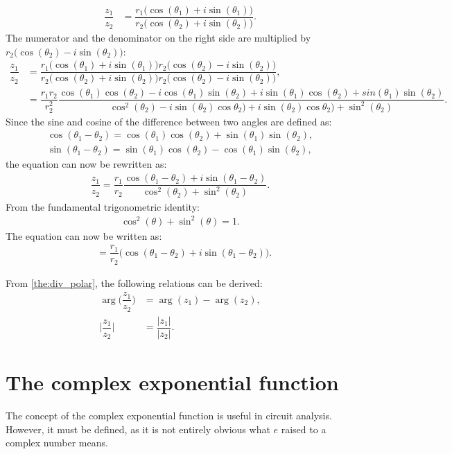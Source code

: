 \begin{prof}{}{}
\begin{align*}
\dfrac{z_1}{z_2}&=\dfrac{r_1\Big(\cos(\theta_1)+i\sin(\theta_1)\Big)}{r_2\Big(\cos(\theta_2)+i\sin(\theta_2)\Big)}.
\end{align*}
The numerator and the denominator on the right side are multiplied by $r_2\Big(\cos(\theta_2)-i\sin(\theta_2)\Big)$:
\begin{align*}
\dfrac{z_1}{z_2}&=\dfrac{r_1\Big(\cos(\theta_1)+i\sin(\theta_1)\Big)r_2\Big(\cos(\theta_2)-i\sin(\theta_2)\Big)}{r_2\Big(\cos(\theta_2)+i\sin(\theta_2)\Big)r_2\Big(\cos(\theta_2)-i\sin(\theta_2)\Big)},
\\
&=\dfrac{r_1 r_2}{r_2^2}\dfrac{\cos(\theta_1)\cos(\theta_2)-i\cos(\theta_1)\sin(\theta_2)+i\sin(\theta_1)\cos(\theta_2)+sin(\theta_1)\sin(\theta_2)}{\cos^2(\theta_2)-i\sin(\theta_2)\cos\theta_2)+i\sin(\theta_2)\cos\theta_2)+\sin^2(\theta_2)}.
\end{align*}
Since the sine and cosine of the difference between two angles are defined as:
\begin{align*}
\cos(\theta_1-\theta_2)=\cos(\theta_1)\cos(\theta_2)+\sin(\theta_1)\sin(\theta_2),
\\
\sin(\theta_1-\theta_2)=\sin(\theta_1)\cos(\theta_2)-\cos(\theta_1)\sin(\theta_2),
\end{align*}
the equation can now be rewritten as:
\begin{align*}
\dfrac{z_1}{z_2}=\dfrac{r_1}{r_2}\dfrac{\cos(\theta_1-\theta_2)+i\sin(\theta_1-\theta_2)}{\cos^2(\theta_2)+\sin^2(\theta_2)}.
\end{align*}
From the fundamental trigonometric identity: 
\begin{align*}
\cos^2(\theta)+\sin^2(\theta)=1.
\end{align*}
The equation can now be written as:
\begin{align*}
&=\dfrac{r_1}{r_2}\Big( \cos(\theta_1-\theta_2)+ i \sin(\theta_1-\theta_2)\Big).
\end{align*}
\end{prof}
\noindent From \cref{the:div_polar}, the following relations can be derived:
\begin{align}
\arg\Big(\dfrac{z_1}{z_2}\Big)&=\arg(z_1)-\arg(z_2),
\\
\Big|\dfrac{z_1}{z_2}\Big|&=\dfrac{|z_1|}{|z_2|}. \label{eq:mod_div}
\end{align}

\section{The complex exponential function}
The concept of the complex exponential function is useful in circuit analysis. However, it must be defined, as it is not entirely obvious what $e$ raised to a complex number means.


